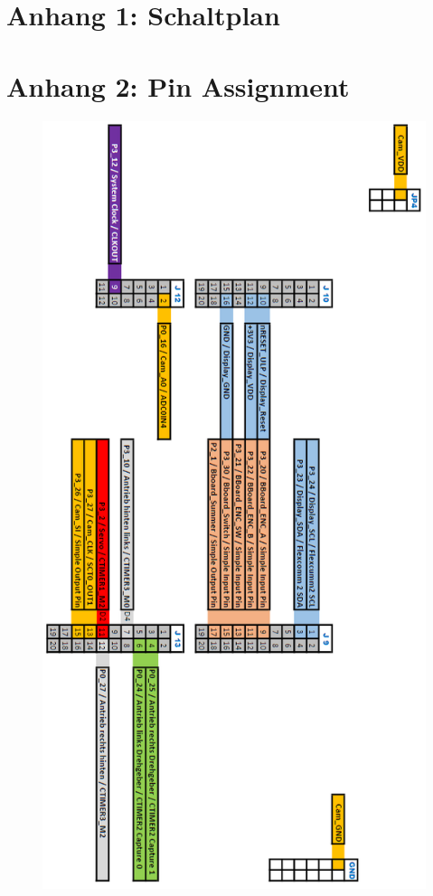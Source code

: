 


\pagestyle{fancy}
\rhead{\thepage} \chead{} 
\cfoot{}


\section*{Anhang 1: Schaltplan} \label{SecAtt1}





\newpage
\pagestyle{fancy}
\rhead{\thepage} \chead{} 
\cfoot{}

\section*{Anhang 2: Pin Assignment} \label{SecAtt2}
\begin{figure}[H] %
\includegraphics[width=.75\textwidth]{attachement/PinAssignment} 
\centering
\label{Att:PinAssignment}
\end{figure}

\newpage
